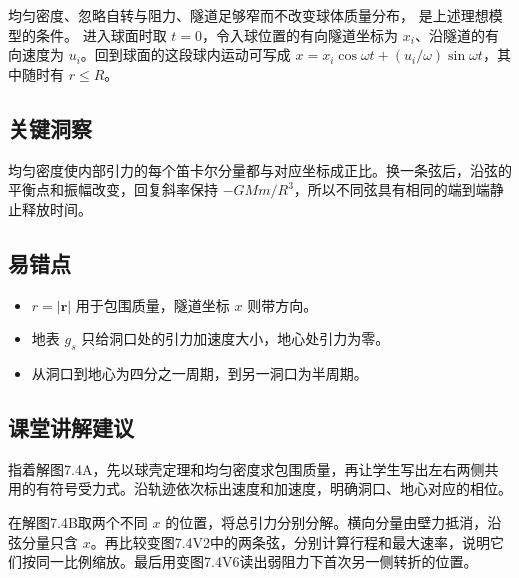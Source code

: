 \documentclass[UTF8,fontset=fandol,a4paper,11pt]{ctexart}
\begin{document}
均匀密度、忽略自转与阻力、隧道足够窄而不改变球体质量分布，
是上述理想模型的条件。
进入球面时取 $t=0$，令入球位置的有向隧道坐标为 $x_i$、沿隧道的有向速度为 $u_i$。回到球面的这段球内运动可写成 $x=x_i\cos\omega t+(u_i/\omega)\sin\omega t$，其中随时有 $r\leq R$。




\subsection*{关键洞察}

均匀密度使内部引力的每个笛卡尔分量都与对应坐标成正比。换一条弦后，沿弦的平衡点和振幅改变，回复斜率保持 $-GMm/R^3$，所以不同弦具有相同的端到端静止释放时间。




\subsection*{易错点}

\begin{itemize}
\item $r=|\boldsymbol r|$ 用于包围质量，隧道坐标 $x$ 则带方向。
\item 地表 $g_s$ 只给洞口处的引力加速度大小，地心处引力为零。
\item 从洞口到地心为四分之一周期，到另一洞口为半周期。
\end{itemize}




\subsection*{课堂讲解建议}

指着解图7.4A，先以球壳定理和均匀密度求包围质量，再让学生写出左右两侧共用的有符号受力式。沿轨迹依次标出速度和加速度，明确洞口、地心对应的相位。

在解图7.4B取两个不同 $x$ 的位置，将总引力分别分解。横向分量由壁力抵消，沿弦分量只含 $x$。再比较变图7.4V2中的两条弦，分别计算行程和最大速率，说明它们按同一比例缩放。最后用变图7.4V6读出弱阻力下首次另一侧转折的位置。



\end{document}

